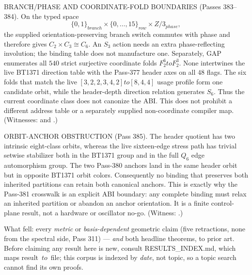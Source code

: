 \documentclass[12pt,a4paper]{article}
\def\mathbb#1{#1}%
\def\mathrm#1{#1}%
\def\textbf#1{#1}%
\def\texttt#1{#1}%
\def\to{ to }%
\theoremstyle{definition}
\begin{document}
\begin{center}
{{\smallskip
\textbf{BRANCH/PHASE AND COORDINATE-FOLD BOUNDARIES (Passes 383--384).}
On the typed space
\[
 \{0,1\}_{\mathrm{branch}}\times\{0,\ldots,15\}_{\mathrm{row}}
 \times\mathbb Z/3_{\mathrm{phase}},
\]
the supplied orientation-preserving branch switch commutes with phase and
therefore gives $C_2\times C_3\cong C_6$.  An $S_3$ action needs an extra
phase-reflecting involution; the binding table does not manufacture one.
Separately, GAP enumerates all $540$ strict surjective coordinate folds %
$\mathbb F_2^6\to\mathbb F_2^3$.  None intertwines the live BT1371 direction
table with the Pass-377 header axes on all $48$ flags.  The six folds that
match the live $[3,2,2,3,4,2]\to[8,4,4]$ usage profile form one candidate
orbit, while the header-depth direction relation generates $S_6$.  Thus the
current coordinate class does not canonize the ABI.  This does not prohibit a
different address table or a separately supplied non-coordinate compiler map.
(Witnesses:
 and
.)

\smallskip
\textbf{ORBIT-ANCHOR OBSTRUCTION (Pass 385).}  The header quotient has two
intrinsic eight-class orbits, whereas the live sixteen-edge stress path has
trivial setwise stabilizer both in the BT1371 group and in the full $Q_6$ edge
automorphism group.  The two Pass-380 anchors land in the same header orbit
but in opposite BT1371 orbit colors.  Consequently no binding that preserves
both inherited partitions can retain both canonical anchors.  This is exactly
why the Pass-381 crosswalk is an explicit ABI boundary: any complete binding
must relax an inherited partition or abandon an anchor orientation.  It is a
finite control-plane result, not a hardware or oscillator no-go.  (Witness:
.)

\smallskip
\textbf{What fell:} every \emph{metric} or \emph{basis-dependent} geometric claim
(five retractions, none from the spectral side, Pass 311) --- \emph{and} both
headline theorems, to prior art. Before claiming any result here is new, consult
\texttt{RESULTS\_INDEX.md}, which maps result~$\to$~file; this corpus is indexed
by \emph{date}, not topic, so a topic search cannot find its own proofs.
}}\end{center}


\begingroup
\setcounter{tocdepth}{1}
\scriptsize
\sloppy
\tableofcontents
\endgroup
\newpage

\end{document}
